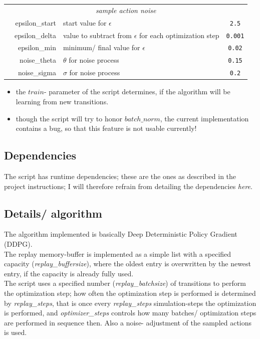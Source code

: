 \documentclass[a4paper]{article}
\begin{document}
\begin{tabular}{ |l|r|l|c| }
\multicolumn{4}{|c|}{\textit{sample action noise}} \\
               & epsilon\_start & start value for $\epsilon$ & \texttt{2.5} \\
               & epsilon\_delta & \makecell[tl]{value to subtract from $\epsilon$ \\ for each optimization step} & \texttt{0.001} \\
               & epsilon\_min & minimum/ final value for $\epsilon$ & \texttt{0.02} \\
               & noise\_theta & $\theta$ for noise process & \texttt{0.15} \\
               & noise\_sigma & $\sigma$ for noise process & \texttt{0.2} \\
\hline
\end{tabular}
\normalsize

\begin{itemize}
\item the $train$- parameter of the script determines, if the algorithm will be learning
from new transitions.
\item though the script will try to honor $batch\_norm$, the current implementation contains
a bug, so that this feature is not usable currently!
\end{itemize}

\subsection{Dependencies}
The script has runtime dependencies; these are the ones as described in the
project instructions; I will therefore refrain from detailing the dependencies \textit{here}.

\subsection{Details/ algorithm}
The algorithm implemented is basically Deep Deterministic Policy Gradient (DDPG).
\\
The replay memory-buffer is implemented as a simple list with a specified capacity (\textit{replay\_buffersize}),
where the oldest entry is overwritten by the newest entry, if the capacity is already
fully used.
\\
The script uses a specified number (\textit{replay\_batchsize}) of transitions
to perform the optimization step; how often the optimization step is performed
is determined by \textit{replay\_steps}, that is once every \textit{replay\_steps}
simulation-steps the optimization is performed, and \textit{optimizer\_steps}
controls how many batches/ optimization steps are performed in sequence then.
Also a noise- adjustment of the sampled actions is used.
\end{document}
